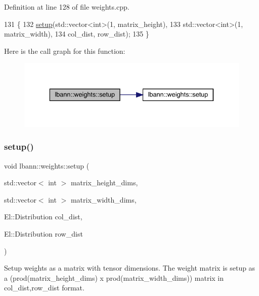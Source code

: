 Definition at line 128 of file weights.\+cpp.


\begin{DoxyCode}
131                                              \{
132   \hyperlink{classlbann_1_1weights_a476989a30cbe62ab2f680235981c3ba5}{setup}(std::vector<int>(1, matrix\_height),
133         std::vector<int>(1, matrix\_width),
134         col\_dist, row\_dist);
135 \}
\end{DoxyCode}
Here is the call graph for this function\+:\nopagebreak
\begin{figure}[H]
\begin{center}
\leavevmode
\includegraphics[width=336pt]{classlbann_1_1weights_aacf5c30b815e2f1c47a33043e440ed65_cgraph}
\end{center}
\end{figure}
\mbox{\label{classlbann_1_1weights_a32a8395709a5238ca93d4b4f102cdc12}} 
\subsubsection{\texorpdfstring{setup()}{setup()}\hspace{0.1cm}{\footnotesize\ttfamily [4/4]}}
{\footnotesize\ttfamily void lbann\+::weights\+::setup (\begin{DoxyParamCaption}\item[{std\+::vector$<$ int $>$}]{matrix\+\_\+height\+\_\+dims,  }\item[{std\+::vector$<$ int $>$}]{matrix\+\_\+width\+\_\+dims,  }\item[{El\+::\+Distribution}]{col\+\_\+dist,  }\item[{El\+::\+Distribution}]{row\+\_\+dist }\end{DoxyParamCaption})\hspace{0.3cm}{\ttfamily [virtual]}}

Setup weights as a matrix with tensor dimensions. The weight matrix is setup as a (prod(matrix\+\_\+height\+\_\+dims) x prod(matrix\+\_\+width\+\_\+dims)) matrix in col\+\_\+dist,row\+\_\+dist format. 

